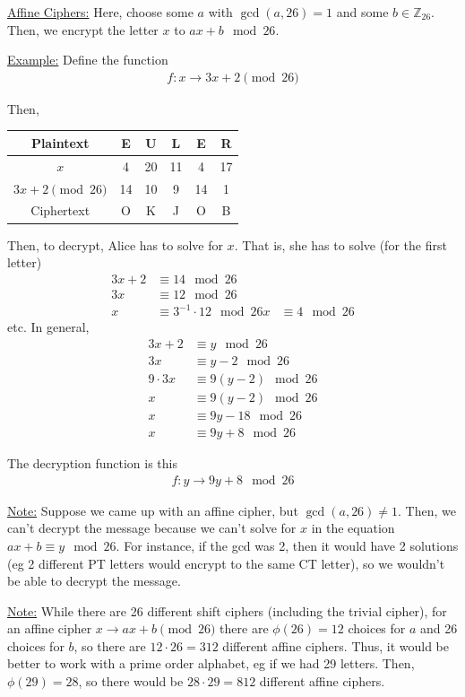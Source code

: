\documentclass{article}
\newcommand*{\zz}{\mathbb{Z}}%
\begin{document}
\underline{Affine Ciphers:} Here, choose some $a$ with $\gcd(a,26)=1$ and some $b\in \zz_{26}$. Then, we encrypt the letter $x$ to $ax+b\mod 26$.

\underline{Example:} Define the function \begin{align*}
    f: x\to 3x+2\pmod{26}
\end{align*}

Then, \begin{center}
    \begin{tabular}{c|c|c|c|c|c}
        Plaintext & E & U & L & E & R\\
        \hline
        $x$ & 4 & 20 & 11 & 4 & 17\\
        $3x+2\pmod{26}$ & 14 & 10 & 9 & 14 & 1\\
        \hline
        Ciphertext & O & K & J & O & B
    \end{tabular}
\end{center}

Then, to decrypt, Alice has to solve for $x$. That is, she has to solve (for the first letter) \begin{align*}
    3x+2&\equiv 14\mod 26\\
    3x&\equiv 12\mod 26\\
    x&\equiv 3^{-1}\cdot 12\mod 26
    x&\equiv 4\mod 26
\end{align*}
etc. In general, \begin{align*}
    3x+2&\equiv y\mod{26}\\
    3x&\equiv y-2\mod 26\\
    9\cdot 3x &\equiv 9(y-2)\mod 26\\
    x&\equiv 9(y-2)\mod 26\\
    x&\equiv 9y-18\mod 26\\
    x&\equiv 9y+8\mod 26
\end{align*}

The decryption function is this \begin{align*}
    f: y\to 9y+8\mod 26
\end{align*}

\underline{Note:} Suppose we came up with an affine cipher, but $\gcd(a,26)\neq 1$. Then, we can't decrypt the message because we can't solve for $x$ in the equation $ax+b\equiv y\mod 26$. For instance, if the gcd was 2, then it would have 2 solutions (eg 2 different PT letters would encrypt to the same CT letter), so we wouldn't be able to decrypt the message.

\underline{Note:} While there are 26 different shift ciphers (including the trivial cipher), for an affine cipher $x\to ax+b\pmod{26}$ there are $\phi(26)=12$ choices for $a$ and 26 choices for $b$, so there are $12\cdot 26=312$ different affine ciphers. Thus, it would be better to work with a prime order alphabet, eg if we had 29 letters. Then, $\phi(29)=28$, so there would be $28\cdot 29=812$ different affine ciphers.
\end{document}
